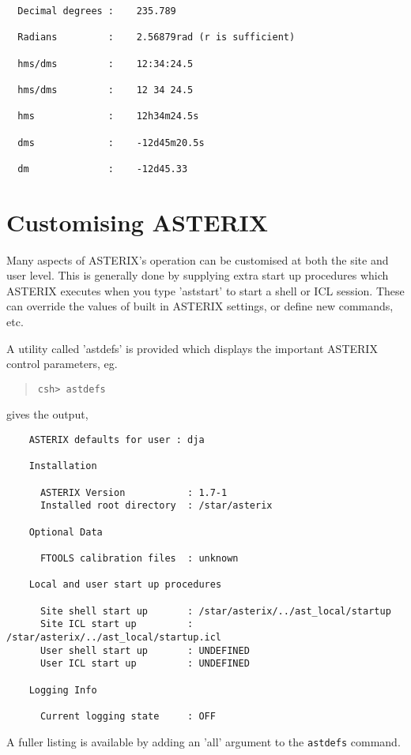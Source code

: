 \documentclass{book}
\renewcommand{\_}{{\tt\char'137}}     %
\begin{document}
\begin{verbatim}
  Decimal degrees :    235.789

  Radians         :    2.56879rad (r is sufficient)

  hms/dms         :    12:34:24.5

  hms/dms         :    12 34 24.5

  hms             :    12h34m24.5s

  dms             :    -12d45m20.5s

  dm              :    -12d45.33
\end{verbatim}
\section{Customising ASTERIX}
Many aspects of ASTERIX's operation can be customised at both the
site and user level. This is generally done by supplying extra
start up procedures which ASTERIX executes when you type 'aststart'
to start a shell or ICL session. These can override the values of
built in ASTERIX settings, or define new commands, etc.

A utility called 'astdefs' is provided which displays the important
ASTERIX control parameters, eg.

\begin{quote}\begin{verbatim}
csh> astdefs
\end{verbatim}\end{quote}
gives the output,
\begin{verbatim}
    ASTERIX defaults for user : dja

    Installation

      ASTERIX Version           : 1.7-1
      Installed root directory  : /star/asterix

    Optional Data

      FTOOLS calibration files  : unknown

    Local and user start up procedures

      Site shell start up       : /star/asterix/../ast_local/startup
      Site ICL start up         : /star/asterix/../ast_local/startup.icl
      User shell start up       : UNDEFINED
      User ICL start up         : UNDEFINED

    Logging Info

      Current logging state     : OFF
    \end{verbatim}
A fuller listing is available by adding an 'all' argument to the
{\tt astdefs} command.
\end{document}
